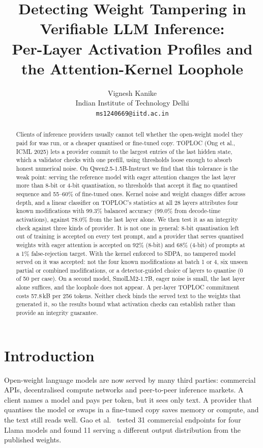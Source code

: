 \documentclass[10pt,twocolumn]{article}
\title{Detecting Weight Tampering in Verifiable LLM Inference:\\Per-Layer Activation Profiles and the Attention-Kernel Loophole}
\author{
  Vignesh Kanike\\
  Indian Institute of Technology Delhi\\
  \texttt{ms1240669@iitd.ac.in}
}
\date{}
\begin{document}
\maketitle

\begin{abstract}
Clients of inference providers usually cannot tell whether the open-weight model they paid for was run, or a cheaper quantised or fine-tuned copy.
TOPLOC (Ong et al., ICML 2025) lets a provider commit to the largest entries of the last hidden state, which a validator checks with one prefill, using thresholds loose enough to absorb honest numerical noise.
On Qwen2.5-1.5B-Instruct we find that this tolerance is the weak point: serving the reference model with eager attention changes the last layer more than 8-bit or 4-bit quantisation, so thresholds that accept it flag no quantised sequence and 55--60\% of fine-tuned ones.
Kernel noise and weight changes differ across depth, and a linear classifier on TOPLOC's statistics at all 28 layers attributes four known modifications with 99.3\% balanced accuracy (99.0\% from decode-time activations), against 78.0\% from the last layer alone.
We then test it as an integrity check against three kinds of provider.
It is not one in general: 8-bit quantisation left out of training is accepted on every test prompt, and a provider that serves quantised weights with eager attention is accepted on 92\% (8-bit) and 68\% (4-bit) of prompts at a 1\% false-rejection target.
With the kernel enforced to SDPA, no tampered model served on it was accepted: not the four known modifications at batch 1 or 4, six unseen partial or combined modifications, or a detector-guided choice of layers to quantise (0 of 50 per case).
On a second model, SmolLM2-1.7B, eager noise is small, the last layer alone suffices, and the loophole does not appear.
A per-layer TOPLOC commitment costs 57.8\,kB per 256 tokens.
Neither check binds the served text to the weights that generated it, so the results bound what activation checks can establish rather than provide an integrity guarantee.
\end{abstract}

\section{Introduction}
\label{sec:intro}

Open-weight language models are now served by many third parties: commercial APIs, decentralised compute networks and peer-to-peer inference markets.
A client names a model and pays per token, but it sees only text.
A provider that quantises the model or swaps in a fine-tuned copy saves memory or compute, and the text still reads well.
Gao et al.~\cite{gao2025model} tested 31 commercial endpoints for four Llama models and found 11 serving a different output distribution from the published weights.
\end{document}
